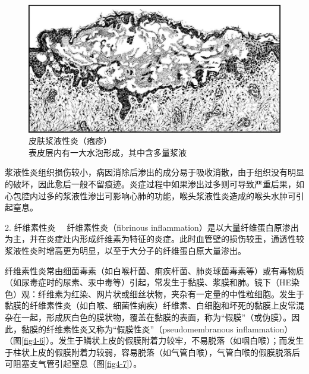 \begin{figure}[!htbp]
 \centering
 \includegraphics{./images/Image00056.jpg}
 \caption{皮肤浆液性炎（疱疹）\\ {\small 表皮层内有一大水泡形成，其中含多量浆液}}
 \label{fig4-5}
  \end{figure} 

浆液性炎组织损伤较小，病因消除后渗出的成分易于吸收消散，由于组织没有明显的破坏，因此愈后一般不留痕迹。炎症过程中如果渗出过多则可导致严重后果，如心包腔内过多的浆液性渗出可影响心肺的功能，喉头浆液性炎造成的喉头水肿可引起窒息。

{2. 纤维素性炎} 　纤维素性炎（fibrinous
inflammation）是以大量纤维蛋白原渗出为主，并在炎症灶内形成纤维素为特征的炎症。此时血管壁的损伤较重，通透性较浆液性炎时增高更为明显，以至于大分子的纤维蛋白原大量渗出。

纤维素性炎常由细菌毒素（如白喉杆菌、痢疾杆菌、肺炎球菌毒素等）或有毒物质（如尿毒症时的尿素、汞中毒等）引起，常发生于黏膜、浆膜和肺。镜下（HE染色）观：纤维素为红染、网片状或细丝状物，夹杂有一定量的中性粒细胞。发生于黏膜的纤维素性炎（如白喉、细菌性痢疾）纤维素、白细胞和坏死的黏膜上皮常混杂在一起，形成灰白色的膜状物，覆盖在黏膜的表面，称为“假膜”（或伪膜）。因此，黏膜的纤维素性炎又称为“假膜性炎”（pseudomembranous
inflammation）（图\ref{fig4-6}）。发生于鳞状上皮的假膜附着力较牢，不易脱落（如咽白喉）；而发生于柱状上皮的假膜附着力较弱，容易脱落（如气管白喉），气管白喉的假膜脱落后可阻塞支气管引起窒息（图\ref{fig4-7}）。

